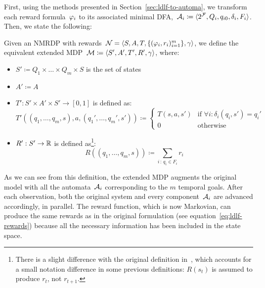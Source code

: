 First, using the methods presented in Section~\ref{sec:ldlf-to-automa}, we
transform each reward formula~$\varphi_i$ to its associated minimal
DFA,~${\mathcal{A}_i \coloneqq \langle 2^{\mathcal{F}}, Q_i, q_{i0}, \delta_i, F_i
\rangle}$. Then, we state the following:
\begin{definition}
	\cite{bib:degiacomo-logic-nmrdp} Given an NMRDP with \ldl{} rewards~$\mathcal{N}
	= \langle S, A, T, \{(\varphi_i, r_i)_{i=1}^m\}, \gamma \rangle$, we
	define the equivalent extended MDP~$\mathcal{M} \coloneqq {\langle S', A', T', R',
	\gamma\rangle}$, where:
	\begin{itemize}
		\item $S' \coloneqq Q_1 \times \dots \times Q_m \times S$ is the set of
			states
		\item $A' \coloneqq A$
		\item $T' : S' \times A' \times S' \to [0, 1]$ is defined as:
			\[
				T'((q_1, \dots, q_m, s), a, (q_1', \dots, q_m', s')) \coloneqq
				\begin{cases}
					T(s, a, s') & \text{if $\forall i : \delta_i(q_i, s') = q_i'$} \\
					0 & \text{otherwise}
				\end{cases}
			\]
		\item $R' : S' \to \mathbb{R}$ is defined as\footnote{There is a slight difference
			with the original definition in~\cite{bib:degiacomo-logic-nmrdp}, which
			accounts for a small notation difference in some previous definitions:
			$R(s_t)$ is assumed to produce $r_t$, not $r_{t+1}$.}:
			\[
				R((q_1, \dots, q_m, s)) \coloneqq \sum_{i\, :\, q_i \in F_i} r_i
			\]
	\end{itemize}
	\label{def:ldlf-eq-mdp}
\end{definition}
As we can see from this definition, the extended MDP augments the original
model with all the automata~$\mathcal{A}_i$ corresponding to the $m$ temporal
goals. After each observation, both the original system and every
component~$\mathcal{A}_i$ are advanced accordingly, in parallel. The reward
function, which is now Markovian, can produce the same rewards as in the
original formulation (see equation~\eqref{eq:ldlf-rewards}) because all the
necessary information has been included in the state space.

